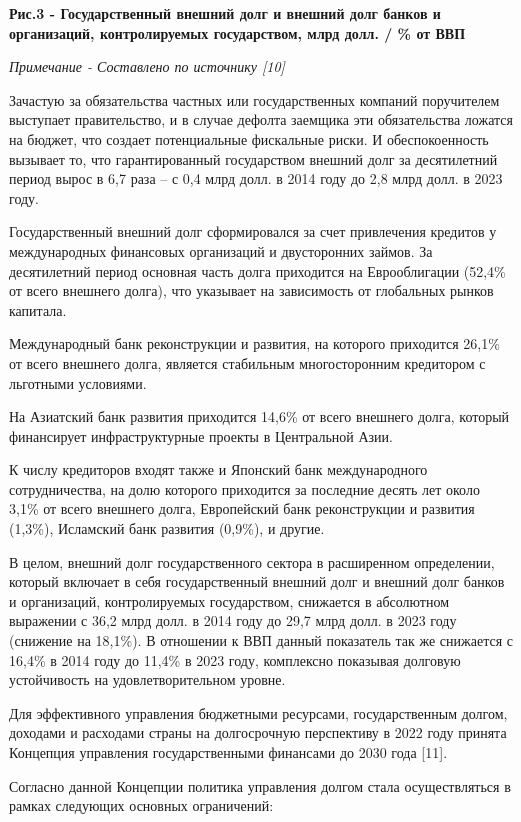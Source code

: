 {\bfseries Рис.3 - Государственный внешний долг и внешний долг банков и организаций, контролируемых государством, млрд долл. / \% от ВВП}

\emph{Примечание - Составлено по источнику {[}10{]}}

\begin{multicols}{2}
Зачастую за обязательства частных или государственных компаний
поручителем выступает правительство, и в случае дефолта заемщика эти
обязательства ложатся на бюджет, что создает потенциальные фискальные
риски. И обеспокоенность вызывает то, что гарантированный государством
внешний долг за десятилетний период вырос в 6,7 раза -- с 0,4 млрд долл.
в 2014 году до 2,8 млрд долл. в 2023 году.

Государственный внешний долг сформировался за счет привлечения кредитов
у международных финансовых организаций и двусторонних займов. За
десятилетний период основная часть долга приходится на Еврооблигации
(52,4\% от всего внешнего долга), что указывает на зависимость от
глобальных рынков капитала.

Международный банк реконструкции и развития, на которого приходится
26,1\% от всего внешнего долга, является стабильным многосторонним
кредитором с льготными условиями.

На Азиатский банк развития приходится 14,6\% от всего внешнего долга,
который финансирует инфраструктурные проекты в Центральной Азии.

К числу кредиторов входят также и Японский банк международного
сотрудничества, на долю которого приходится за последние десять лет
около 3,1\% от всего внешнего долга, Европейский банк реконструкции и
развития (1,3\%), Исламский банк развития (0,9\%), и другие.

В целом, внешний долг государственного сектора в расширенном
определении, который включает в себя государственный внешний долг и
внешний долг банков и организаций, контролируемых государством,
снижается в абсолютном выражении с 36,2 млрд долл. в 2014 году до 29,7
млрд долл. в 2023 году (снижение на 18,1\%). В отношении к ВВП данный
показатель так же снижается с 16,4\% в 2014 году до 11,4\% в 2023 году,
комплексно показывая долговую устойчивость на удовлетворительном уровне.

Для эффективного управления бюджетными ресурсами, государственным
долгом, доходами и расходами страны на долгосрочную перспективу в 2022
году принята Концепция управления государственными финансами до 2030
года {[}11{]}.

Согласно данной Концепции политика управления долгом стала
осуществляться в рамках следующих основных ограничений:


\end{multicols}
